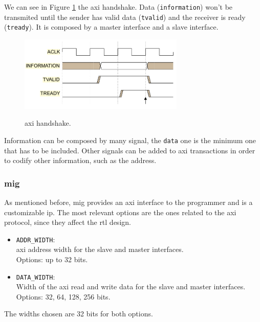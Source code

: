We can see in Figure \ref{fig:axi} the \gls{axi} handshake. %
Data (\texttt{information}) won't be transmited until the sender has valid data (\texttt{tvalid}) and the receiver is ready (\texttt{tready}).
It is composed by a master interface and a slave interface.

\begin{figure}
    \centering
    \includegraphics[width=0.7\textwidth]{../presentation/images/axi.png}
    \label{fig:axi}
    \caption{\gls{axi} handshake.}
\end{figure}

Information can be composed by many signal, the \texttt{data} one is the minimum one that has to be included.
Other signals can be added to \gls{axi} transactions in order to codify other information, such as the address.

\subsubsection{\acrshort{mig}}
As mentioned before, \gls{mig} provides an \gls{axi} interface to the programmer and is a customizable \gls{ip}. 
The most relevant options are the ones related to the \gls{axi} protocol, since they affect the \gls{rtl} design.
\begin{itemize}
    \item \texttt{ADDR\_WIDTH}: \\
        \gls{axi} address width for the slave and master interfaces. \\
        Options: up to 32 bits.
        
    \item \texttt{DATA\_WIDTH}: \\
        Width of the \gls{axi} read and write data for the slave and master interfaces. \\
        Options: 32, 64, 128, 256 bits.
\end{itemize}

The widths chosen are 32 bits for both options.

